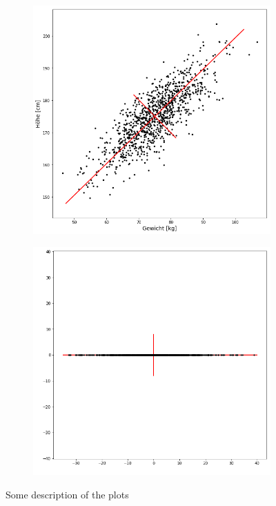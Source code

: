 \documentclass{beamer}
\theoremstyle{plain}
\theoremstyle{definition}
\begin{document}
\begin{frame}
\begin{figure}
\centering
	\begin{subfigure}{0.45\textwidth}
	\centering
	\includegraphics[width = \textwidth]{figures/pca_example.png}
	\label{pca_example_original}
	\end{subfigure}
	\begin{subfigure}{0.45\textwidth}
	\centering
	\includegraphics[width = \textwidth]{figures/pca_example_rotated.png}
	\label{pca_example_rotated}
	\end{subfigure}

\caption{Some description of the plots}
\label{pca_example}
\end{figure}
\end{frame}
\end{document}
